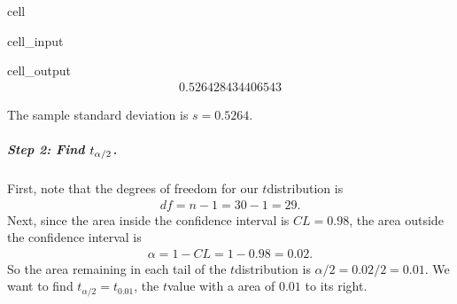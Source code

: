 \documentclass[letterpaper,10pt,english]{jupyterBook}
\begin{document}
\begin{sphinxuseclass}{cell}\begin{sphinxVerbatimInput}

\begin{sphinxuseclass}{cell_input}
\begin{sphinxVerbatim}[commandchars=\\\{\}]
\end{sphinxVerbatim}

\end{sphinxuseclass}\end{sphinxVerbatimInput}
\begin{sphinxVerbatimOutput}

\begin{sphinxuseclass}{cell_output}\begin{equation*}
\begin{split}0.526428434406543\end{split}
\end{equation*}
\end{sphinxuseclass}\end{sphinxVerbatimOutput}

\end{sphinxuseclass}
\sphinxAtStartPar
The sample standard deviation is \(s = 0.5264\).


\subparagraph{Step 2: Find \protect\(t_{\alpha/2}\protect\).}
\label{\detokenize{Ch5 Confidence Intervals/5.4 Estimating Population Means (Sigma Unknown):id3}}
\sphinxAtStartPar
First, note that the degrees of freedom for our \(t\)\sphinxhyphen{}distribution is
\begin{equation*}
\begin{split} df = n-1 = 30-1 = 29. \end{split}
\end{equation*}
\sphinxAtStartPar
Next, since the area inside the confidence interval is \(CL = 0.98\), the area outside the confidence interval is
\begin{equation*}
\begin{split} \alpha = 1 - CL = 1 - 0.98 = 0.02. \end{split}
\end{equation*}
\sphinxAtStartPar
So the area remaining in each tail of the \(t\)\sphinxhyphen{}distribution is \(\alpha/2 = 0.02/2 = 0.01\). We want to find \(t_{\alpha/2} = t_{0.01}\), the \(t\)\sphinxhyphen{}value with a area of \(0.01\) to its right.
\end{document}
